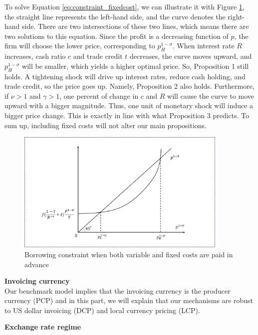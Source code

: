 To solve Equation \ref{eq:constraint_fixedcost}, we can illustrate it with Figure \ref{fig: fixed_cost}, the straight line represents the left-hand side, and the curve denotes the right-hand side. There are two intersections of these two lines, which means there are two solutions to this equation. Since the profit is a decreasing function of $p$, the firm will choose the lower price, corresponding to $p_H^{1-\sigma}$. When interest rate $R$ increases, cash ratio $c$ and trade credit $t$ decreases, the curve moves upward, and $p_H^{1-\sigma}$ will be smaller, which yields a higher optimal price. So, Proposition 1 still holds. A tightening shock will drive up interest rates, reduce cash holding, and trade credit, so the price goes up. Namely, Proposition 2 also holds. Furthermore, if $\nu>1$ and $\gamma>1$, one percent of change in $c$ and $R$ will cause the curve to move upward with a bigger magnitude. Thus, one unit of monetary shock will induce a bigger price change. This is exactly in line with what Proposition 3 predicts. To sum up, including fixed costs will not alter our main propositions.

\begin{figure}[H]
     \centering
         \includegraphics[width=0.9\textwidth]{latex/drafts/pic/fixed_cost.png}
         \caption{\small Borrowing constraint when both variable and fixed costs are paid in advance}
         \label{fig: fixed_cost}
\end{figure}


\textbf{Invoicing currency} \\

Our benchmark model implies that the invoicing currency is the producer currency (PCP) and in this part, we will explain that our mechanisms are robust to US dollar invoicing (DCP) and local currency pricing (LCP).


\textbf{Exchange rate regime}




